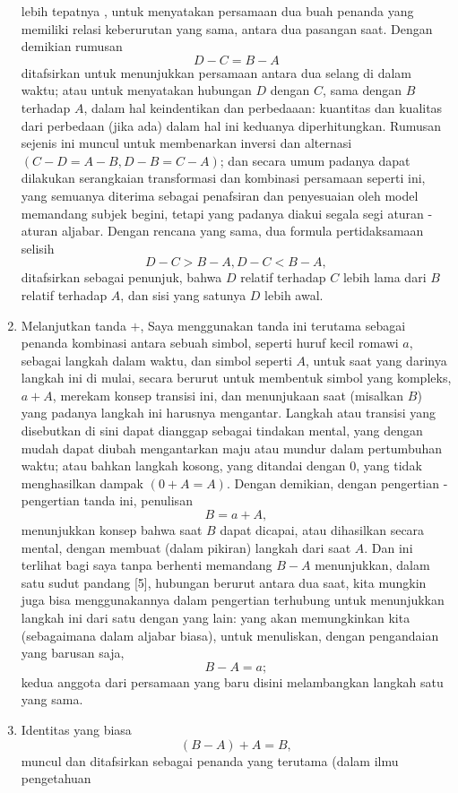 \documentclass[a4paper, 12pt]{book}
\begin{document}
\begin{enumerate}
lebih tepatnya , untuk menyatakan persamaan dua buah penanda yang memiliki
relasi keberurutan yang sama, antara dua pasangan saat. Dengan demikian
rumusan
\[
D - C = B - A
\]
ditafsirkan untuk menunjukkan persamaan antara dua selang di dalam waktu;
atau untuk menyatakan hubungan $D$ dengan $C$, sama dengan $B$ terhadap $A$,
dalam hal keindentikan dan perbedaaan: kuantitas dan kualitas dari perbedaan
(jika ada) dalam hal ini keduanya diperhitungkan. Rumusan sejenis ini muncul
untuk membenarkan inversi dan alternasi $(C - D = A - B, D - B = C - A)$; dan
secara umum padanya dapat dilakukan serangkaian transformasi dan kombinasi
persamaan seperti ini, yang semuanya diterima sebagai penafsiran dan 
penyesuaian oleh model memandang subjek begini, tetapi yang padanya diakui
segala segi aturan - aturan aljabar. Dengan rencana yang sama, dua formula
pertidaksamaan selisih
\[
D - C > B - A, D - C < B - A,
\]
ditafsirkan sebagai penunjuk, bahwa $D$ relatif terhadap $C$ lebih lama dari
$B$ relatif terhadap $A$, dan sisi yang satunya $D$ lebih awal.
\item Melanjutkan tanda $+$, Saya menggunakan tanda ini terutama sebagai 
penanda kombinasi antara sebuah simbol, seperti huruf kecil romawi $a$, sebagai
langkah dalam waktu, dan simbol seperti $A$, untuk saat yang darinya langkah
ini di mulai, secara berurut untuk membentuk simbol yang kompleks, $a + A$,
merekam konsep transisi ini, dan menunjukaan saat (misalkan $B$) yang padanya
langkah ini harusnya mengantar. Langkah atau transisi yang disebutkan
di sini dapat dianggap sebagai tindakan mental, yang dengan mudah dapat
diubah mengantarkan maju atau mundur dalam pertumbuhan waktu; atau bahkan 
langkah kosong, yang ditandai dengan $0$, yang tidak menghasilkan dampak
$(0 + A = A)$. Dengan demikian, dengan pengertian - pengertian tanda ini, 
penulisan
\[
B = a + A,
\]
menunjukkan konsep bahwa saat $B$ dapat dicapai, atau dihasilkan secara mental,
dengan membuat (dalam pikiran) langkah dari saat $A$. Dan ini terlihat bagi 
saya tanpa berhenti memandang $B - A$ menunjukkan, dalam satu sudut pandang 
[5], hubungan berurut antara dua saat, kita mungkin juga bisa menggunakannya
dalam pengertian terhubung untuk menunjukkan langkah ini dari satu dengan 
yang lain: yang akan memungkinkan kita (sebagaimana dalam aljabar biasa), untuk
menuliskan, dengan pengandaian yang barusan saja,
\[
B - A = a;
\]
kedua anggota dari persamaan yang baru disini melambangkan langkah satu yang 
sama.
\item Identitas yang biasa
\[
(B - A) + A = B,
\]
muncul dan ditafsirkan sebagai penanda yang terutama (dalam ilmu pengetahuan 

\end{enumerate}
\end{document}
